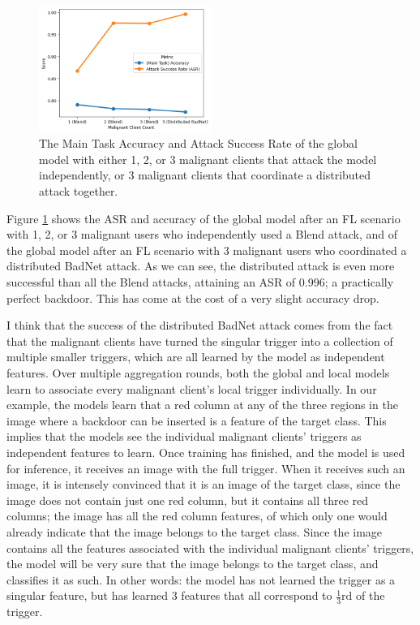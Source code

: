 \documentclass{article}
\begin{document}
\begin{figure}
    \centering
    \includegraphics[width=0.5\textwidth]{dba.png}
    \caption{The Main Task Accuracy and Attack Success Rate of the global model with either 1, 2, or 3 malignant clients that attack the model independently, or 3 malignant clients that coordinate a distributed attack together.}
    \label{fig:dba}
\end{figure}

Figure \ref{fig:dba} shows the ASR and accuracy of the global model after an FL scenario with 1, 2, or 3 malignant users who independently used a Blend attack, and of the global model after an FL scenario with 3 malignant users who coordinated a distributed BadNet attack.
As we can see, the distributed attack is even more successful than all the Blend attacks, attaining an ASR of 0.996; a practically perfect backdoor.
This has come at the cost of a very slight accuracy drop.

I think that the success of the distributed BadNet attack comes from the fact that the malignant clients have turned the singular trigger into a collection of multiple smaller triggers, which are all learned by the model as independent features.
Over multiple aggregation rounds, both the global and local models learn to associate every malignant client's local trigger individually.
In our example, the models learn that a red column at any of the three regions in the image where a backdoor can be inserted is a feature of the target class.
This implies that the models see the individual malignant clients' triggers as independent features to learn.
Once training has finished, and the model is used for inference, it receives an image with the full trigger.
When it receives such an image, it is intensely convinced that it is an image of the target class, since the image does not contain just one red column, but it contains all three red columns; the image has all the red column features, of which only one would already indicate that the image belongs to the target class.
Since the image contains all the features associated with the individual malignant clients' triggers, the model will be very sure that the image belongs to the target class, and classifies it as such.
In other words: the model has not learned the trigger as a singular feature, but has learned 3 features that all correspond to $\frac{1}{3}\text{rd}$ of the trigger.
\end{document}
